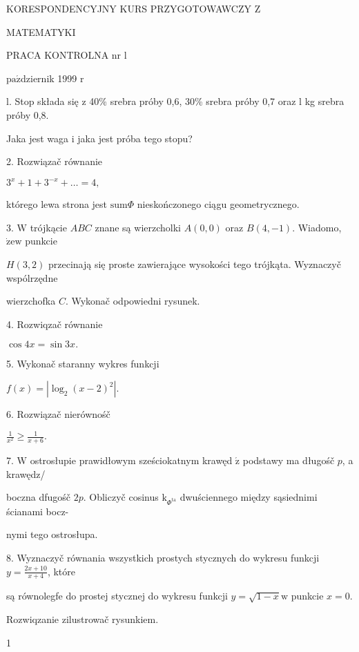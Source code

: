 \documentclass[a4paper,12pt]{article}
\begin{document}
KORESPONDENCYJNY KURS PRZYGOTOWAWCZY Z

MATEMATYKI

PRACA KONTROLNA nr l

$\mathrm{p}\mathrm{a}\acute{\mathrm{z}}$dziernik 1999 $\mathrm{r}$

l. Stop składa się $\mathrm{z}$ 40\% srebra próby 0,6, 30\% srebra próby 0,7 oraz l kg srebra próby 0,8.

Jaka jest waga $\mathrm{i}$ jaka jest próba tego stopu?

2. Rozwiązač równanie

$3^{x}+1+3^{-x}+\ldots=4,$

którego lewa strona jest $\mathrm{s}\mathrm{u}\mathrm{m}\Phi$ nieskończonego ciągu geometrycznego.

3. $\mathrm{W}$ trójkącie $ABC$ znane są wierzcholki $A(0,0)$ oraz $B(4,-1)$. Wiadomo, $\dot{\mathrm{z}}\mathrm{e}\mathrm{w}$ punkcie

$H(3,2)$ przecinają się proste zawierające wysokości tego trójkąta. Wyznaczyč wspólrzędne

wierzchofka $C$. Wykonač odpowiedni rysunek.

4. Rozwiqzač równanie

$\cos 4x=\sin 3x.$

5. Wykonač staranny wykres funkcji

$f(x)=|\log_{2}(x-2)^{2}|.$

6. Rozwiązač nierównośč

$\displaystyle \frac{1}{x^{2}}\geq\frac{1}{x+6}.$

7. $\mathrm{W}$ ostrosłupie prawidłowym sześciokatnym krawęd $\acute{\mathrm{z}}$ podstawy ma długośč $p$, a krawędz/

boczna dfugośč $2p$. Obliczyč cosinus $\mathrm{k}_{\Phi^{\mathrm{t}\mathrm{a}}}$ dwuściennego między sąsiednimi ścianami bocz-

nymi tego ostrosłupa.

8. Wyznaczyč równania wszystkich prostych stycznych do wykresu funkcji $y=\displaystyle \frac{2x+10}{x+4}$, które

są równolegfe do prostej stycznej do wykresu funkcji $y = \sqrt{1-x}\mathrm{w}$ punkcie $x = 0.$

Rozwiqzanie zilustrowač rysunkiem.

1
\end{document}
